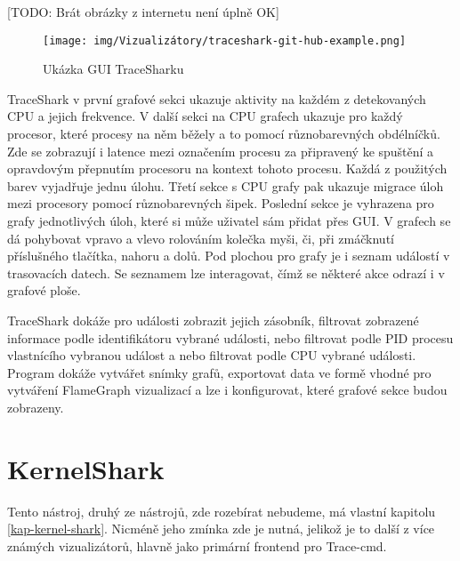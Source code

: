 [TODO: Brát obrázky z internetu není úplně OK]
\begin{figure}[p]\centering
    \texttt{[image: img/Vizualizátory/traceshark-git-hub-example.png]}
    \caption{Ukázka GUI TraceSharku}
    \label{traceshark-github}
\end{figure}

TraceShark v první grafové sekci ukazuje aktivity na každém z detekovaných CPU a jejich frekvence. V další sekci na CPU grafech ukazuje pro každý procesor, které procesy na něm běžely a to pomocí různobarevných obdélníčků. Zde se zobrazují i latence mezi označením procesu za připravený ke spuštění a opravdovým přepnutím procesoru na kontext tohoto procesu. Každá z použitých barev vyjadřuje jednu úlohu. Třetí sekce s CPU grafy pak ukazuje migrace úloh mezi procesory pomocí různobarevných šipek. Poslední sekce je vyhrazena pro grafy jednotlivých úloh, které si může uživatel sám přidat přes GUI. V grafech se dá pohybovat vpravo a vlevo rolováním kolečka myši, či, při zmáčknutí příslušného tlačítka, nahoru a dolů. Pod plochou pro grafy je i seznam událostí v trasovacích datech. Se seznamem lze interagovat, čímž se některé akce odrazí i v grafové ploše.

TraceShark dokáže pro události zobrazit jejich zásobník, filtrovat zobrazené informace podle identifikátoru vybrané události, nebo filtrovat podle PID procesu vlastnícího vybranou událost a nebo filtrovat podle CPU vybrané události. Program dokáže vytvářet snímky grafů, exportovat data ve formě vhodné pro vytváření FlameGraph vizualizací a lze i konfigurovat, které grafové sekce budou zobrazeny.

\section{KernelShark}

Tento nástroj, druhý ze  nástrojů, zde rozebírat nebudeme, má vlastní kapitolu \ref{kap-kernel-shark}. Nicméně jeho zmínka zde je nutná, jelikož je to další z více známých vizualizátorů, hlavně jako primární frontend pro Trace-cmd.